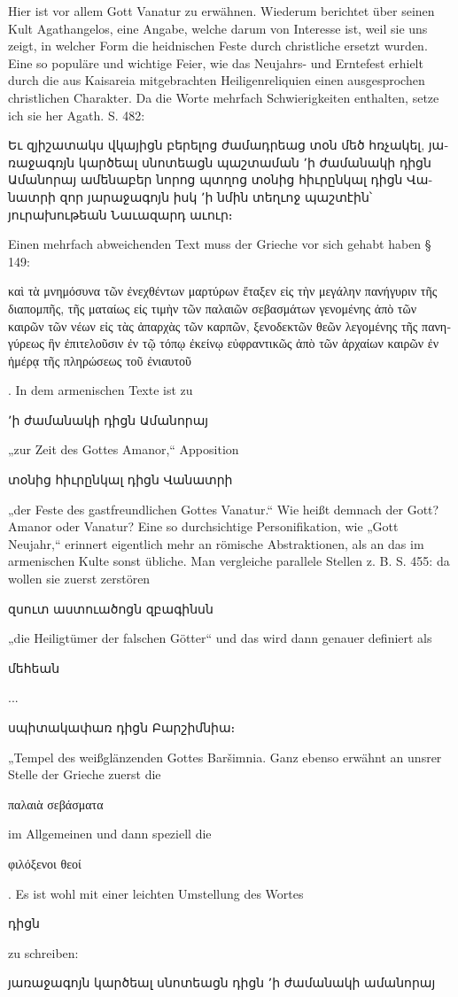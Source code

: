 \documentclass{article}
\begin{document}
Hier ist vor allem Gott Vanatur zu erwähnen. Wiederum berichtet über seinen Kult Agathangelos, eine Angabe, welche darum von Interesse ist, weil sie uns zeigt, in welcher Form die heidnischen Feste durch christliche ersetzt wurden. Eine so populäre und wichtige Feier, wie das Neujahrs- und Erntefest erhielt durch die aus Kaisareia mitgebrachten Heiligenreliquien einen ausgesprochen christlichen Charakter. Da die Worte mehrfach Schwierigkeiten enthalten, setze ich sie her Agath. S. 482: \begin{armenian}Եւ զյիշատակս վկայիցն բերելոց ժամադրեաց տօն մեծ հռչակել, յառաջագռյն կարծեալ սնոտեացն պաշտաման ՚ի ժամանակի դիցն Ամանորայ ամենաբեր նորոց պտղոց տօնից հիւրընկալ դիցն Վանատրի զոր յարաջագոյն իսկ ՚ի նմին տեղւոջ պաշտէին՝ յուրախութեան Նաւազարդ աւուր։\end{armenian} Einen mehrfach abweichenden Text muss der Grieche vor sich gehabt haben § 149: \begin{greek}καὶ τὰ μνημόσυνα τῶν ἐνεχθέντων μαρτύρων ἔταξεν εἰς τὴν μεγάλην πανήγυριν τῆς διαπομπῆς, τῆς ματαίως εἰς τιμὴν τῶν παλαιῶν σεβασμάτων γενομένης ἀπὸ τῶν καιρῶν τῶν νέων εἰς τὰς ἀπαρχὰς τῶν καρπῶν, ξενοδεκτῶν θεῶν λεγομένης τῆς πανηγύρεως ἣν ἐπιτελοῦσιν ἐν τῷ τόπῳ ἐκείνῳ εὐφραντικῶς ἀπὸ τῶν ἀρχαίων καιρῶν ἐν ἡμέρᾳ τῆς πληρώσεως τοῦ ἐνιαυτοῦ\end{greek}. In dem armenischen Texte ist zu \begin{armenian}՚ի ժամանակի դիցն Ամանորայ\end{armenian} „zur Zeit des Gottes Amanor,“ Apposition \begin{armenian}տօնից հիւրընկալ դիցն Վանատրի\end{armenian} „der Feste des gastfreundlichen Gottes Vanatur.“ Wie heißt demnach der Gott? Amanor oder Vanatur? Eine so durchsichtige Personifikation, wie „Gott Neujahr,“ erinnert eigentlich mehr an römische Abstraktionen, als an das im armenischen Kulte sonst übliche. Man vergleiche parallele Stellen z. B. S. 455: da wollen sie zuerst zerstören \begin{armenian}զսուտ աստուածոցն զբագինսն\end{armenian} „die Heiligtümer der falschen Götter“ und das wird dann genauer definiert als \begin{armenian}մեհեան\end{armenian}... \begin{armenian}սպիտակափառ դիցն Բարշիմնիա։\end{armenian} „Tempel des weißglänzenden Gottes Baršimnia. Ganz ebenso erwähnt an unsrer Stelle der Grieche zuerst die \begin{greek}παλαιὰ σεβάσματα\end{greek} im Allgemeinen und dann speziell die \begin{greek}φιλόξενοι θεοί\end{greek}. Es ist wohl mit einer leichten Umstellung des Wortes \begin{armenian}դիցն\end{armenian} zu schreiben: \begin{armenian}յառաջագոյն կարծեալ սնոտեացն դիցն ՚ի ժամանակի ամանորայ\end{armenian} 
\end{document}

